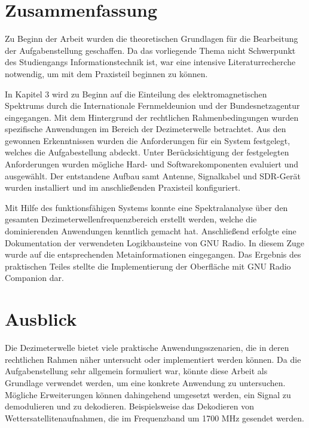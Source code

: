 
\section{Zusammenfassung}
Zu Beginn der Arbeit wurden die theoretischen Grundlagen für die Bearbeitung der Aufgabenstellung geschaffen. Da das vorliegende Thema nicht Schwerpunkt des Studiengangs Informationstechnik ist, war eine intensive Literaturrecherche notwendig, um mit dem Praxisteil beginnen zu können.

In Kapitel 3 wird zu Beginn auf die Einteilung des elektromagnetischen Spektrums durch die Internationale Fernmeldeunion und der Bundesnetzagentur eingegangen. Mit dem Hintergrund der rechtlichen Rahmenbedingungen wurden spezifische Anwendungen im Bereich der Dezimeterwelle betrachtet. Aus den gewonnen Erkenntnissen wurden die Anforderungen für ein System festgelegt, welches die Aufgabestellung abdeckt. Unter Berücksichtigung der festgelegten Anforderungen wurden mögliche Hard- und Softwarekomponenten evaluiert und ausgewählt. Der entstandene Aufbau samt Antenne, Signalkabel und SDR-Gerät wurden installiert und im anschließenden Praxisteil konfiguriert. 

Mit Hilfe des funktionsfähigen Systems konnte eine Spektralanalyse über den gesamten Dezimeterwellenfrequenzbereich erstellt werden, welche die dominierenden Anwendungen kenntlich gemacht hat. Anschließend erfolgte eine Dokumentation der verwendeten Logikbausteine von GNU Radio. In diesem Zuge wurde auf die entsprechenden Metainformationen eingegangen. Das Ergebnis des praktischen Teiles stellte die Implementierung der Oberfläche mit GNU Radio Companion dar.  




\section{Ausblick}
Die Dezimeterwelle bietet viele praktische Anwendungsszenarien, die in deren rechtlichen Rahmen näher untersucht oder implementiert werden können.
Da die Aufgabenstellung sehr allgemein formuliert war, könnte diese Arbeit als Grundlage verwendet werden, um eine konkrete Anwendung zu untersuchen. Mögliche Erweiterungen können dahingehend umgesetzt werden, ein Signal zu demodulieren und zu dekodieren.
Beispielsweise das Dekodieren von Wettersatellitenaufnahmen, die im Frequenzband um 1700 MHz gesendet werden. 